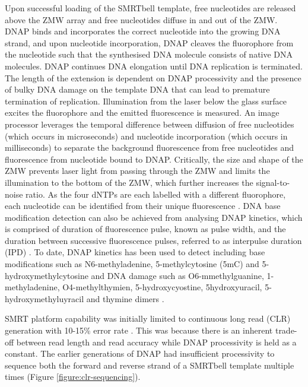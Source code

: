 Upon successful loading of the SMRTbell template, free nucleotides are released above the ZMW array and free nucleotides diffuse in and out of the ZMW. DNAP binds and incorporates the correct nucleotide into the growing DNA strand, and upon nucleotide incorporation, DNAP cleaves the fluorophore from the nucleotide such that the synthesised DNA molecule consists of native DNA molecules. DNAP continues DNA elongation until DNA replication is terminated. The length of the extension is dependent on DNAP processivity and the presence of bulky DNA damage on the template DNA that can lead to premature termination of replication. Illumination from the laser below the glass surface excites the fluorophore and the emitted fluorescence is measured. An image processor leverages the temporal difference between diffusion of free nucleotides (which occurs in microseconds) and nucleotide incorporation (which occurs in milliseconds) to separate the background fluorescence from free nucleotides and fluorescence from nucleotide bound to DNAP. Critically, the size and shape of the ZMW prevents laser light from passing through the ZMW and limits the illumination to the bottom of the ZMW, which further increases the signal-to-noise ratio. As the four dNTPs are each labelled with a different fluorophore, each nucleotide can be identified from their unique fluorescence \cite{Eid2009-ol}. DNA base modification detection can also be achieved from analysing DNAP kinetics, which is comprised of duration of fluorescence pulse, known as pulse width, and the duration between successive fluorescence pulses, referred to as interpulse duration (IPD) \cite{Flusberg2010-ub}. To date, DNAP kinetics has been used to detect including base modifications such as N6-methyladenine, 5-methylcytosine (5mC) and 5-hydroxymethylcytosine \cite{Flusberg2010-ub} and DNA damage such as O6-mmethylguanine, 1-methyladenine, O4-methylthymien, 5-hydroxycyostine, 5hydroxyuracil, 5-hydroxymethyluyracil and thymine dimers \cite{Clark2011-jz}. 

SMRT platform capability was initially limited to continuous long read (CLR) generation with 10-15\% error rate \cite{Eid2009-ol}. This was because there is an inherent trade-off between read length and read accuracy while DNAP processivity is held as a constant. The earlier generations of DNAP had insufficient processivity to sequence both the forward and reverse strand of a SMRTbell template multiple times (Figure \ref{figure:clr-sequencing}).

